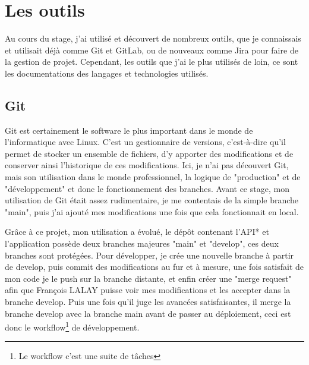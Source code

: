 \documentclass[a4paper,12pt]{report}
\begin{document}
\section{Les outils}
Au cours du stage, j'ai utilisé et découvert de nombreux outils, que je connaissais et utilisait déjà comme Git et GitLab, ou de nouveaux comme Jira pour faire de la gestion de projet. Cependant, les outils que j'ai le plus utilisés de loin, ce sont les documentations des langages et technologies utilisés.

\subsection{Git}
Git est certainement le software le plus important dans le monde de l'informatique avec Linux. C'est un gestionnaire de versions, c'est-à-dire qu'il permet de stocker un ensemble de fichiers, d'y apporter des modifications et de conserver ainsi l'historique de ces modifications. Ici, je n'ai pas découvert Git, mais son utilisation dans le monde professionnel, la logique de "production" et de "développement" et donc le fonctionnement des branches. Avant ce stage, mon utilisation de Git était assez rudimentaire, je me contentais de la simple branche "main", puis j'ai ajouté mes modifications une fois que cela fonctionnait en local.


Grâce à ce projet, mon utilisation a évolué, le dépôt contenant l'API* et l'application possède deux branches majeures "main" et "develop", ces deux branches sont protégées. Pour développer, je crée une nouvelle branche à partir de develop, puis commit des modifications au fur et à mesure, une fois satisfait de mon code je le push sur la branche distante, et enfin créer une "merge request" afin que François LALAY puisse voir mes modifications et les accepter dans la branche develop. Puis une fois qu'il juge les avancées satisfaisantes, il merge la branche develop avec la branche main avant de passer au déploiement, ceci est donc le workflow\footnote{Le workflow c'est une suite de tâches} de développement.
\end{document}
